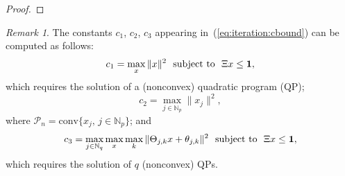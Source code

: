 \documentclass[journal]{IEEEtran}
\newcommand{\todo}[2]{%
  \providetoggle{#1}%
    \iftoggle{#1}{%
    {\color{red}#2}%
    }{#2}%
}
\providecommand{\conv}{\text{conv}}
\newcounter{thmcount}
\theoremstyle{remark}
\newtheorem{rem}[thmcount]{Remark}
\theoremstyle{definition}
\begin{document}
\begin{proof}

\end{proof}

\begin{rem}
The constants $c_1$, $c_2$, $c_3$ appearing in~(\ref{eq:iteration:cbound}) can be computed as follows:
\[
c_1 = \max_x \|x\|^2 \ \ \text{subject to} \ \  \Xi x\leq {\bf 1} ,
\]
which requires the solution of a (nonconvex) quadratic program (QP);
\[
c_2 = \max_{j\in\mathbb{N}_p} \|x_j\|^2 ,
\]
where 
$\mathcal{P}_n  =\conv\{x_j,\, j\in\mathbb{N}_p\}$; 
and
\[
c_3 = \max_{j\in\mathbb{N}_q} \max_x \todo{Manuel:convHull}{\max_k} \|\Theta_{j\todo{Manuel:convHull}{,k}} x + \theta_{j\todo{Manuel:convHull}{,k}}\|^2 \ \  \text{subject to} \ \ \Xi x \leq {\bf 1} ,
\]
which requires the solution of $q$ (nonconvex) QPs.
\end{rem}
\end{document}
